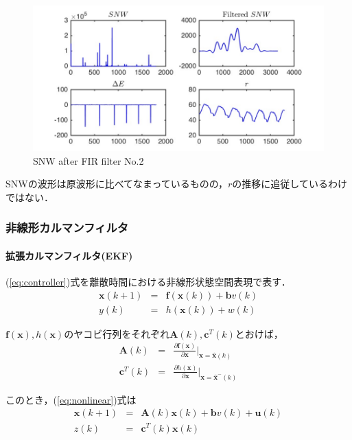 \documentclass[twocolumn,oneside,a4paper]{article}
\begin{document}
\begin{figure}[htbp]
    \includegraphics[bb=0 0 432 216,width=1\columnwidth]{gcodesim_filtered.pdf}
    \caption{SNW after FIR filter No.2}
   \label{fig:filtered}
\end{figure}


SNWの波形は原波形に比べてなまっているものの，$r$の推移に追従しているわけではない．


\subsubsection{非線形カルマンフィルタ}
\paragraph{拡張カルマンフィルタ(EKF)}
(\ref{eq:controller})式を離散時間における非線形状態空間表現で表す．
\begin{eqnarray*}\label{eq:nonlinear}
\bm{x}(k+1) &=& \bm{f}(\bm{x}(k))+\bm{b}v(k)\\
y(k) &=& h(\bm{x}(k))+w(k)
\end{eqnarray*}

$\bm{f}(\bm{x}), h(\bm{x})$のヤコビ行列をそれぞれ$\bm{A}(k), \bm{c}^T(k)$とおけば，
\begin{eqnarray*}
\bm{A}(k) &=& \frac{\partial \bm{f}(\bm{x})}{\partial \bm{x}} \bigg| _{\bm{x}=\hat{\bm{x}}(k)}\\
\bm{c}^T(k) &=& \frac{\partial h(\bm{x})}{\partial \bm{x} } \bigg| _{\bm{x}=\hat{\bm{x}}^{-}(k)}
\end{eqnarray*}


このとき，(\ref{eq:nonlinear})式は
\begin{eqnarray*}
\bm{x}(k+1) &=& \bm{A}(k)\bm{x}(k) + \bm{b}v(k)+\bm{u}(k)\\
z(k) &=& \bm{c}^T(k)\bm{x}(k)
\end{eqnarray*}
\end{document}
